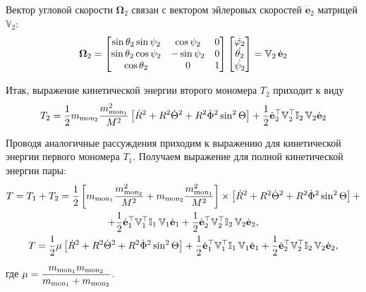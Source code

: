 \documentclass[14pt]{extarticle}
\newcommand{\mmf}{m_{\textup{mon}_1}}
\newcommand{\mms}{m_{\textup{mon}_2}}
\newcommand{\dveulerf}{\dot{\mathbf{e}}_1}
\newcommand{\dveulers}{\dot{\mathbf{e}}_2}
\newcommand{\dR}{\dot{R}}
\newcommand{\dTheta}{\dot{\Theta}}
\newcommand{\dPhi}{\dot{\Phi}}
\newcommand{\Omt}{\boldsymbol{\Omega}_2}
\newcommand{\bbVf}{\mathbb{V}_1}
\newcommand{\bbVs}{\mathbb{V}_2}
\newcommand{\bbIf}{\mathbb{I}_1 \,}
\newcommand{\bbIt}{\mathbb{I}_2 \,}
\newcommand{\lsq}{\left[}
\newcommand{\rsq}{\right]}
\begin{document}
Вектор угловой скорости $\Omt$ связан с вектором эйлеровых скоростей $\dveulers$ матрицей $\bbVs$:
\begin{gather}
	\Omt = \begin{bmatrix}
		\sin \theta_2 \sin \psi_2 &  \cos \psi_2 & 0 \\
		\sin \theta_2 \cos \psi_2 & - \sin \psi_2 & 0 \\
		\cos \theta_2 & 0 & 1
	\end{bmatrix} 
	\begin{bmatrix}
		\dot{\varphi_2} \\
		\dot{\theta_2} \\
		\dot {\psi_2} 
	\end{bmatrix} =
	\bbVs \, \dveulers \notag
\end{gather}

Итак, выражение кинетической энергии второго мономера $T_2$ приходит к виду
\begin{gather}
		T_2 = \frac{1}{2} \mms \frac{\mmf^2}{M^2} \lsq \dR^2 + R^2 \dTheta^2 + R^2 \dPhi^2 \sin^2 \Theta \rsq + \frac{1}{2} \dveulers^\top \bbVs^\top \bbIt \bbVs \dveulers
\end{gather}

Проводя аналогичные рассуждения приходим к выражению для кинетической энергии первого мономера $T_1$. Получаем выражение для полной кинетической энергии пары:
\begin{gather}
		T = T_1 + T_2 = \frac{1}{2} \lsq \mmf \frac{\mms^2}{M^2} + \mms \frac{\mmf^2}{M^2} \rsq \times \lsq \dR^2 + R^2 \dTheta^2 + R^2 \dPhi^2 \sin^2 \Theta \rsq + \notag \\ + \frac{1}{2} \dveulerf^\top \bbVf^\top \bbIf \bbVf \dveulerf + \frac{1}{2} \dveulers^\top \bbVs^\top \bbIt \bbVs \dveulers,  \\
		T = \frac{1}{2} \mu \lsq \dR^2 + R^2 \dTheta^2 + R^2 \dPhi^2 \sin^2 \Theta \rsq + \frac{1}{2} \dveulerf^\top \bbVf^\top \bbIf \bbVf \dveulerf + \frac{1}{2} \dveulers^\top \bbVs^\top \bbIt \bbVs \dveulers, \label{total}
\end{gather}

где $\displaystyle \mu = \frac{\mmf \mms}{\mmf + \mms}$.
\end{document}

